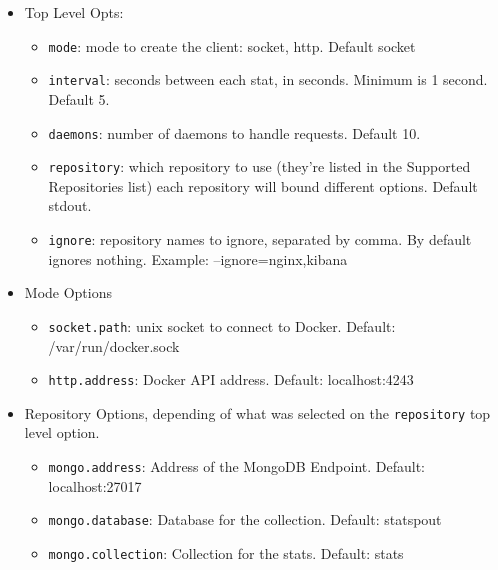 \begin{itemize}
    \item
        Top Level Opts:
        \begin{itemize}
            \item \texttt{mode}: mode to create the client: socket, http. Default socket
            
            \item \texttt{interval}: seconds between each stat, in seconds. Minimum is 1 second. Default 5.
            
            \item \texttt{daemons}: number of daemons to handle requests. Default 10.
            
            \item \texttt{repository}: which repository to use (they're listed in the Supported Repositories list) each repository will bound different options. Default stdout.

            \item \texttt{ignore}: repository names to ignore, separated by comma. By default ignores nothing. Example: --ignore=nginx,kibana
        \end{itemize}
    
    \item 
        Mode Options
        
        \begin{itemize}
            \item \texttt{socket.path}: unix socket to connect to Docker. Default: /var/run/docker.sock
            
            \item \texttt{http.address}: Docker API address. Default: localhost:4243
        \end{itemize}
    
    \item
        Repository Options, depending of what was selected on the \texttt{repository} top level option.
        
        \begin{itemize}
            \item \texttt{mongo.address}: Address of the MongoDB Endpoint. Default: localhost:27017
            
            \item \texttt{mongo.database}: Database for the collection. Default: statspout
            
            \item \texttt{mongo.collection}: Collection for the stats. Default: stats
            

\end{itemize}
\end{itemize}
